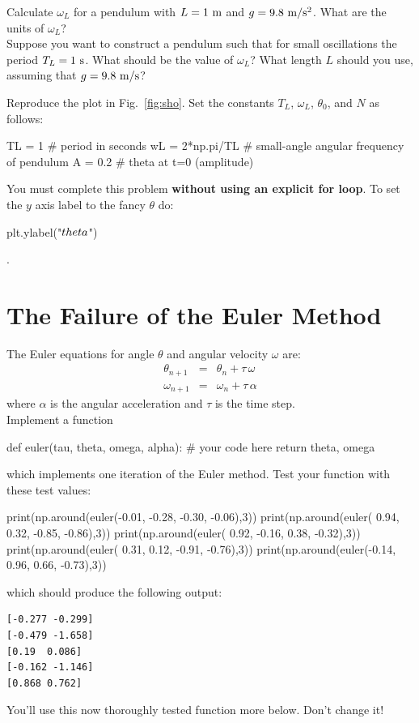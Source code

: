 \plot Calculate $\omega_L$ for a pendulum with $L=1~\rm m$ and $g=9.8~\rm m/s^2$.
What are the units of $\omega_L$?\\

\plot  Suppose you want to construct a pendulum such that for small
oscillations the period $T_L = 1~\rm s$.  What should be the value of
$\omega_L$?  What length $L$ should you use, assuming that $g=9.8~\rm
m/s$?\\

\newpage

\plot Reproduce the plot in Fig.~\ref{fig:sho}.  Set the
constants $T_L$, $\omega_L$, $\theta_0$, and $N$ as follows:
\begin{python}
TL = 1          # period in seconds 
wL = 2*np.pi/TL # small-angle angular frequency of pendulum 
A  = 0.2        # theta at t=0 (amplitude)
\end{python}
You must complete this problem {\bf without using an explicit for
  loop}.  To set the $y$ axis label to the fancy $\theta$ do:
\begin{python}
plt.ylabel("$\\theta$")
\end{python}.

\section{The Failure of the Euler Method}

The Euler equations for angle $\theta$ and angular velocity $\omega$ are:
\begin{eqnarray}
  \theta_{n+1} &=& \theta_n + \tau \, \omega \\
  \omega_{n+1} &=& \omega_n + \tau \, \alpha 
\end{eqnarray}
where $\alpha$ is the angular acceleration and $\tau$ is the time step.\\

\plot Implement a function
\begin{python}
def euler(tau, theta, omega, alpha):
   # your code here
   return theta, omega
\end{python}
which implements one iteration of the Euler method.
Test your  function with these test values:
\begin{python}
print(np.around(euler(-0.01, -0.28, -0.30, -0.06),3))
print(np.around(euler( 0.94,  0.32, -0.85, -0.86),3))
print(np.around(euler( 0.92, -0.16,  0.38, -0.32),3))
print(np.around(euler( 0.31,  0.12, -0.91, -0.76),3))
print(np.around(euler(-0.14,  0.96,  0.66, -0.73),3))
\end{python}
which should produce the following output:
\begin{verbatim}
[-0.277 -0.299]
[-0.479 -1.658]
[0.19  0.086]
[-0.162 -1.146]
[0.868 0.762]
\end{verbatim}
You'll use this now thoroughly tested function more below.  Don't change it!\\

